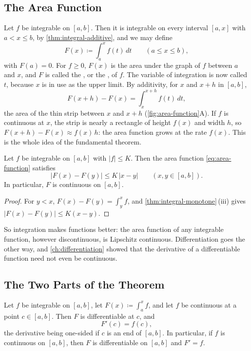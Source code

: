 \subsection{The Area Function}

Let $f$ be integrable on $[a,b]$. Then it is integrable on every interval $[a,x]$ with $a<x\le b$, by \cref{thm:integral-additive}, and we may define
\begin{equation}
F(x)\coloneqq\int_a^xf(t)\,dt\qquad(a\le x\le b),
\label{eq:area-function}
\end{equation}
with $F(a)=0$. For $f\ge0$, $F(x)$ is the area under the graph of $f$ between $a$ and $x$, and $F$ is called the , or the , of $f$. The variable of integration is now called $t$, because $x$ is in use as the upper limit. By additivity, for $x$ and $x+h$ in $[a,b]$,
\[
F(x+h)-F(x)=\int_x^{x+h}f(t)\,dt ,
\]
the area of the thin strip between $x$ and $x+h$ (\cref{fig:area-function}A). If $f$ is continuous at $x$, the strip is nearly a rectangle of height $f(x)$ and width $h$, so $F(x+h)-F(x)\approx f(x)\,h$: the area function grows at the rate $f(x)$. This is the whole idea of the fundamental theorem.

\begin{proposition}
\label{prop:area-function-lipschitz}
Let $f$ be integrable on $[a,b]$ with $|f|\le K$. Then the area function \eqref{eq:area-function} satisfies
\[
|F(x)-F(y)|\le K\,|x-y|\qquad(x,y\in[a,b]) .
\]
In particular, $F$ is continuous on $[a,b]$.
\end{proposition}

\begin{proof}
For $y<x$, $F(x)-F(y)=\int_y^xf$, and \cref{thm:integral-monotone}\,(iii) gives $|F(x)-F(y)|\le K(x-y)$.
\end{proof}

So integration makes functions better: the area function of any integrable function, however discontinuous, is Lipschitz continuous. Differentiation goes the other way, and \cref{ch:differentiation} showed that the derivative of a differentiable function need not even be continuous.

\subsection{The Two Parts of the Theorem}

\begin{theorem}
\label{thm:ftc1}
Let $f$ be integrable on $[a,b]$, let $F(x)\coloneqq\int_a^xf$, and let $f$ be continuous at a point $c\in[a,b]$. Then $F$ is differentiable at $c$, and
\[
F'(c)=f(c),
\]
the derivative being one-sided if $c$ is an end of $[a,b]$. In particular, if $f$ is continuous on $[a,b]$, then $F$ is differentiable on $[a,b]$ and $F'=f$.
\end{theorem}

